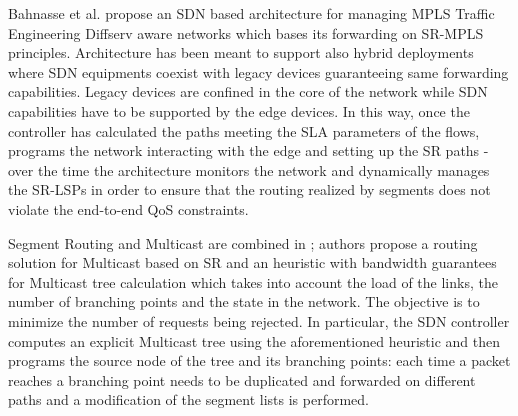 Bahnasse et al. \cite{novelsdn} propose an SDN based architecture for managing MPLS Traffic Engineering Diffserv aware networks which bases its forwarding on SR-MPLS principles. Architecture has been meant to support also hybrid deployments where SDN equipments coexist with legacy devices guaranteeing same forwarding capabilities. Legacy devices are confined in the core of the network while SDN capabilities have to be supported by the edge devices. In this way, once the controller has calculated the paths meeting the SLA parameters of the flows, programs the network interacting with the edge and setting up the SR paths - over the time the architecture monitors the network and dynamically manages the SR-LSPs in order to ensure that the routing realized by segments does not violate the end-to-end QoS constraints.

Segment Routing and Multicast are combined in \cite{ascalableand}; authors propose a routing solution for Multicast based on SR and an heuristic with bandwidth guarantees for Multicast tree calculation which takes into account the load of the links, the number of branching points and the state in the network. The objective is to minimize the number of requests being rejected. In particular, the SDN controller computes an explicit Multicast tree using the aforementioned heuristic and then programs the source node of the tree and its branching points: each time a packet reaches a branching point needs to be duplicated and forwarded on different paths and a modification of the segment lists is performed. 

